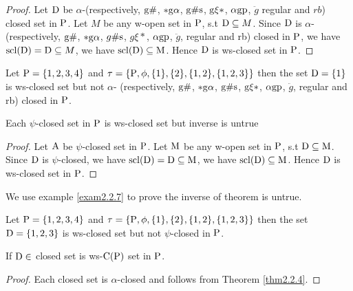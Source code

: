\begin{proof}
Let $\mathrm{D}$ be $\alpha$-(respectively, $\mathrm{g}\#$, $*\mathrm{g}\alpha$, $\mathrm{g}\# \mathrm{s}$, $\mathrm{g}\xi*$, $\alpha\mathrm{g}\mathrm{p}$, $\ddot{g}$ regular and $rb$) closed set in $\mathrm{P}$. Let $M$ be any w-open set in $\mathrm{P}$, s.t $\mathrm{D} \subseteq M$. Since $\mathrm{D}$ is $\alpha$- (respectively, $\mathrm{g}\#$, $*\mathrm{g}\alpha$, $g\# \mathrm{s}$, $g\xi*$, $\alpha\mathrm{g}\mathrm{p}$, $\ddot{g}$, regular and rb) closed in $\mathrm{P}$, we have $\mathrm{scl}(\mathrm{D}) = \mathrm{D} \subseteq M$, we have $\mathrm{scl}(\mathrm{D}) \subseteq \mathrm{M}$. Hence $\mathrm{D}$ is ws-closed set in $\mathrm{P}$.
\end{proof}

\begin{exm}\label{exam2.2.5}
Let $\mathrm{P}= \{1, 2, 3, 4\}$ and $\tau=\{\mathrm{P}, \phi, \{1\}, \{2\},\{1, 2\}, \{1, 2, 3\}\}$ then the set $\mathrm{D}=\{1\}$ is ws-closed set but not $\alpha$- (respectively, $\mathrm{g}\#$, $*\mathrm{g}\alpha$, $\mathrm{g}\# \mathrm{s}$, $\mathrm{g}\xi*$, $\alpha\mathrm{g}\mathrm{p}$, $\ddot{g}$, regular and rb) closed in $\mathrm{P}$.
\end{exm}

\begin{thm}\label{thm2.2.6}
Each $\psi$-closed set in $\mathrm{P}$ is ws-closed set but inverse is untrue
\end{thm}

\begin{proof}
Let $\mathrm{A}$ be $\psi$-closed set in $\mathrm{P}$. Let $\mathrm{M}$ be any w-open set in $\mathrm{P}$, s.t $\mathrm{D}\subseteq \mathrm{M}$. Since $\mathrm{D}$ is $\psi$-closed, we have $\mathrm{scl}(\mathrm{D})=\mathrm{D}\subseteq \mathrm{M}$, we have $\mathrm{scl}(\mathrm{D})\subseteq \mathrm{M}$. Hence $\mathrm{D}$ is ws-closed set in $\mathrm{P}$.
\end{proof}

We use example \ref{exam2.2.7} to prove the inverse of theorem is untrue.

\begin{exm}\label{exam2.2.7}
Let $\mathrm{P}= \{1, 2, 3, 4\}$ and  $\tau= \{\mathrm{P}, \phi, \{1\}, \{2\},\{1, 2\}, \{1, 2, 3\}\}$ then the set $\mathrm{D}= \{1,2,3\}$ is ws-closed set but not $\psi$-closed in $\mathrm{P}$.
\end{exm}

\begin{coro}\label{coro2.2.8}
If $\mathrm{D}\in$ closed set is ws-$\mathrm{C}(\mathrm{P})$ set in $\mathrm{P}$.
\end{coro}

\begin{proof}
Each closed set is $\alpha$-closed and follows from Theorem \ref{thm2.2.4}.
\end{proof}

